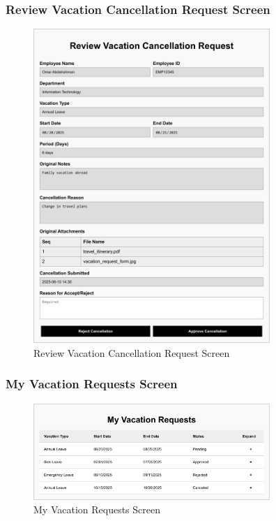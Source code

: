 \documentclass[12pt,a4paper]{article}
\begin{document}
\subsubsection{Review Vacation Cancellation Request Screen}
\begin{figure}[H]
\centering
\includegraphics[width=0.8\textwidth]{Wireframes/Review-Vacation-Cancellation-Request/Review-Vacation-Cancellation-Request-1.png}
\caption{Review Vacation Cancellation Request Screen}
\label{fig:review-cancellation-screen}
\end{figure}

\subsubsection{My Vacation Requests Screen}
\begin{figure}[H]
\centering
\includegraphics[width=0.8\textwidth]{Wireframes/My-Vacation-Requests/My-Vacation-Requests-1.png}
\caption{My Vacation Requests Screen}
\label{fig:my-vacation-requests-screen}
\end{figure}
\end{document}
